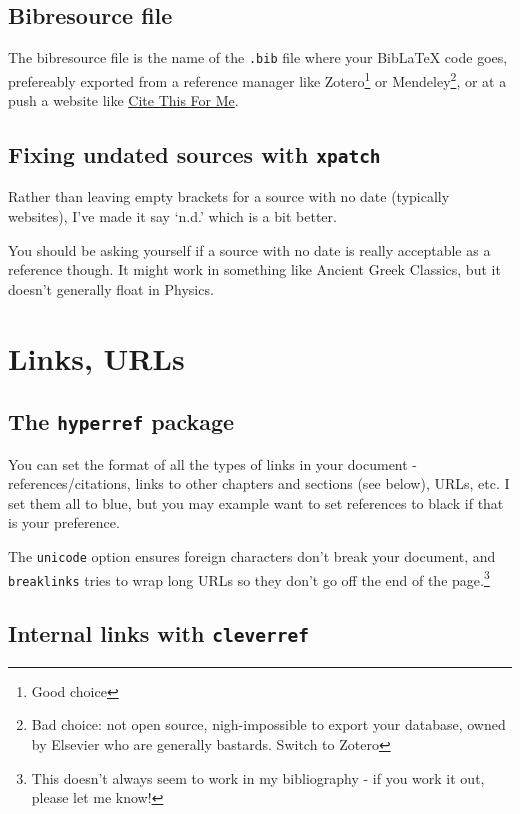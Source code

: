 \documentclass[../main]{subfiles}
\begin{document}
\subsection{Bibresource file}

The bibresource file is the name of the \texttt{.bib} file where your BibLaTeX code goes, prefereably exported from a reference manager like Zotero\footnote{Good choice} or Mendeley\footnote{Bad choice: not open source, nigh-impossible to export your database, owned by Elsevier who are generally bastards. Switch to Zotero}, or at a push a website like \href{https://www.citethisforme.com/}{Cite This For Me}. 

\subsection{Fixing undated sources with \texttt{xpatch}}

Rather than leaving empty brackets for a source with no date (typically websites), I've made it say `n.d.' which is a bit better.

You should be asking yourself if a source with no date is really acceptable as a reference though. It might work in something like Ancient Greek Classics, but it doesn't generally float in Physics.

\section{Links, URLs}

\subsection{The \texttt{hyperref} package}

You can set the format of all the types of links in your document - references/citations, links to other chapters and sections (see below), URLs, etc. I set them all to blue, but you may example want to set references to black if that is your preference.

The \texttt{unicode} option ensures foreign characters don't break your document, and \texttt{breaklinks} tries to wrap long URLs so they don't go off the end of the page.\footnote{This doesn't always seem to work in my bibliography - if you work it out, please let me know!}

\subsection{Internal links with \texttt{cleverref}}
\end{document}

